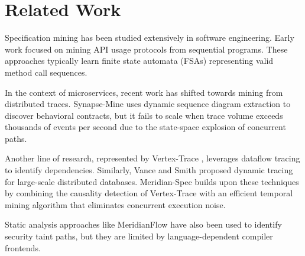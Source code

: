 \section{Related Work}
Specification mining has been studied extensively in software engineering. Early work focused on mining API usage protocols from sequential programs. These approaches typically learn finite state automata (FSAs) representing valid method call sequences.

In the context of microservices, recent work has shifted towards mining from distributed traces. Synapse-Mine \cite{williams2021synapse} uses dynamic sequence diagram extraction to discover behavioral contracts, but it fails to scale when trace volume exceeds thousands of events per second due to the state-space explosion of concurrent paths.

Another line of research, represented by Vertex-Trace \cite{zhang2023vertex}, leverages dataflow tracing to identify dependencies. Similarly, Vance and Smith \cite{vance2022nexa} proposed dynamic tracing for large-scale distributed databases. Meridian-Spec builds upon these techniques by combining the causality detection of Vertex-Trace with an efficient temporal mining algorithm that eliminates concurrent execution noise.

Static analysis approaches like MeridianFlow \cite{taylor2022meridianflow} have also been used to identify security taint paths, but they are limited by language-dependent compiler frontends.
